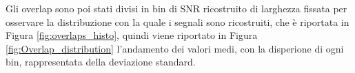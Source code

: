 Gli overlap sono poi stati divisi in bin di SNR ricostruito di larghezza fissata per osservare la distribuzione con la quale i segnali sono ricostruiti, che è riportata in Figura \ref{fig:overlaps_histo}, quindi viene riportato in Figura \ref{fig:Overlap_distribution} l'andamento dei valori medi, con la disperione di ogni bin, rappresentata della deviazione standard.\\

